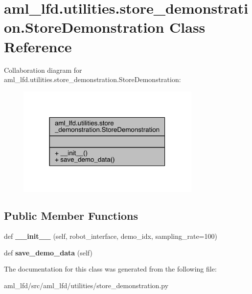 \hypertarget{classaml__lfd_1_1utilities_1_1store__demonstration_1_1_store_demonstration}{}\section{aml\+\_\+lfd.\+utilities.\+store\+\_\+demonstration.\+Store\+Demonstration Class Reference}
\label{classaml__lfd_1_1utilities_1_1store__demonstration_1_1_store_demonstration}


Collaboration diagram for aml\+\_\+lfd.\+utilities.\+store\+\_\+demonstration.\+Store\+Demonstration\+:\nopagebreak
\begin{figure}[H]
\begin{center}
\leavevmode
\includegraphics[width=257pt]{classaml__lfd_1_1utilities_1_1store__demonstration_1_1_store_demonstration__coll__graph}
\end{center}
\end{figure}
\subsection*{Public Member Functions}
\begin{DoxyCompactItemize}
\item 
\hypertarget{classaml__lfd_1_1utilities_1_1store__demonstration_1_1_store_demonstration_af976114c7c390e22bb58688849e0d313}{}\label{classaml__lfd_1_1utilities_1_1store__demonstration_1_1_store_demonstration_af976114c7c390e22bb58688849e0d313} 
def {\bfseries \+\_\+\+\_\+init\+\_\+\+\_\+} (self, robot\+\_\+interface, demo\+\_\+idx, sampling\+\_\+rate=100)
\item 
\hypertarget{classaml__lfd_1_1utilities_1_1store__demonstration_1_1_store_demonstration_af712a5bc7ae0793a53700c1f123aaf5f}{}\label{classaml__lfd_1_1utilities_1_1store__demonstration_1_1_store_demonstration_af712a5bc7ae0793a53700c1f123aaf5f} 
def {\bfseries save\+\_\+demo\+\_\+data} (self)
\end{DoxyCompactItemize}


The documentation for this class was generated from the following file\+:\begin{DoxyCompactItemize}
\item 
aml\+\_\+lfd/src/aml\+\_\+lfd/utilities/store\+\_\+demonstration.\+py\end{DoxyCompactItemize}
